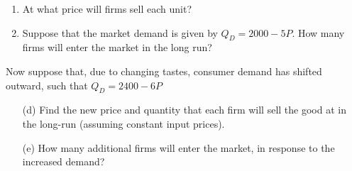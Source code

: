 \documentclass[11pt]{article}
\begin{document}
\begin{enumerate}
\begin{enumerate}
    \item At what price will firms sell each unit?

    \item Suppose that the market demand is given by $Q_D = 2000 - 5P$. How many firms will enter the market in the long run?

  \end{enumerate}

  Now suppose that, due to changing tastes, consumer demand has shifted outward, such that $Q_D = 2400 - 6P$
  \begin{enumerate}
    \item[(d)] Find the new price and quantity that each firm will sell the good at in the long-run (assuming constant input prices).

    \item[(e)] How many additional firms will enter the market, in response to the increased demand?
  \end{enumerate}
  



\end{enumerate}
\end{document}
